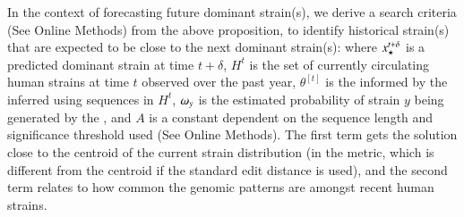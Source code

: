 \documentclass[onecolumn, compsoc,10pt]{IEEEtran}
\def\METHODS{Online Methods\xspace}
\begin{document}
In the context of  forecasting  future dominant strain(s),  we derive a search criteria (See \METHODS) from the above proposition, to identify  historical strain(s) that are  expected to be close to the next dominant strain(s):
%
%
where $x_\star^{t+\delta}$ is a predicted dominant strain  at time $t+\delta$, $H^t$ is the set of currently circulating human strains at time $t$  observed over the past year, $\theta^{[t]}$ is the \qdist informed by the inferred \enet using sequences in $H^t$, $\omega_{y}$ is the estimated probability of strain $y$ being generated by the \enet, and $A$ is a constant dependent on the sequence length and significance threshold used (See \METHODS). The first term gets the solution close to the centroid of the current strain distribution (in the \qdist metric, which is different from the centroid if the standard edit distance is used), and the second term relates to how common the genomic patterns are amongst recent human strains. 
\end{document}
